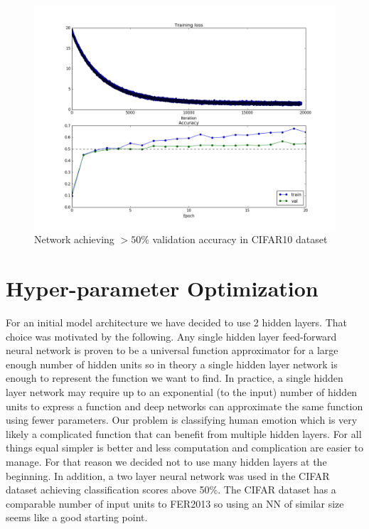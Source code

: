 \documentclass[12pt,twoside]{article}
\begin{document}
\begin{figure}[]
\centering %
\includegraphics[width = 0.8\hsize]{./figures/cifar_2layer.png} %
\caption{Network achieving $>50\%$ validation accuracy in CIFAR10 dataset} %
\label{fig:cifar_2layer} %
\end{figure}

\section{Hyper-parameter Optimization}

For an initial model architecture we have decided to use 2 hidden layers. That choice was motivated by the following. Any single hidden layer feed-forward neural network is proven to be a universal function approximator for a large enough number of hidden units so in theory a single hidden layer network is enough to represent the function we want to find. In practice, a single hidden layer network may require up to an exponential (to the input) number of hidden units to express a function and deep networks can approximate the same function using fewer parameters. Our problem is classifying human emotion which is very likely a complicated function that can benefit from multiple hidden layers. For all things equal simpler is better and less computation and complication are easier to manage. For that reason we decided not to use many hidden layers at the beginning. In addition, a two layer neural network was used in the CIFAR dataset achieving classification scores above 50\%. The CIFAR dataset has a comparable number of input units to FER2013 so using an NN of similar size seems like a good starting point.
\end{document}
